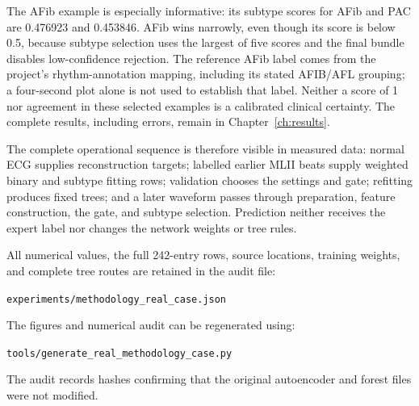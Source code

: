 The AFib example is especially informative: its subtype scores for AFib and
PAC are 0.476923 and 0.453846. AFib wins narrowly, even though its score is
below 0.5, because subtype selection uses the largest of five scores and
the final bundle disables low-confidence rejection. The reference AFib label
comes from the project's rhythm-annotation mapping, including its stated
AFIB/AFL grouping; a four-second plot alone is not used to establish that
label. Neither a score of 1 nor agreement in these selected examples is a
calibrated clinical certainty. The complete results, including errors, remain
in Chapter~\ref{ch:results}.

The complete operational sequence is therefore visible in measured data:
normal ECG supplies reconstruction targets; labelled earlier MLII beats
supply weighted binary and subtype fitting rows; validation chooses the
settings and gate; refitting produces fixed trees; and a later waveform
passes through preparation, feature construction, the gate, and subtype
selection. Prediction neither receives the expert label nor changes the
network weights or tree rules.

All numerical values, the full 242-entry rows, source locations, training
weights, and complete tree routes are retained in the audit file:
\par{\small\nolinkurl{experiments/methodology_real_case.json}}\par
The figures and numerical audit can be regenerated using:
\par{\small\nolinkurl{tools/generate_real_methodology_case.py}}\par
The audit records hashes
confirming that the original autoencoder and forest files were not modified.
